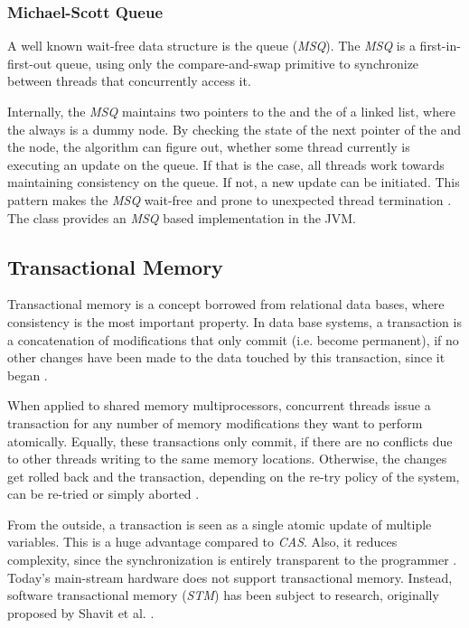 \subsubsection{Michael-Scott Queue}
\label{sec:introduction-msq}

A well known wait-free data structure is the \citet{Michael1996Simple} queue
(\emph{MSQ}). The \emph{MSQ} is a first-in-first-out queue, using only the
compare-and-swap primitive to synchronize between threads that concurrently
access it.

Internally, the \emph{MSQ} maintains two pointers to the  and
the  of a linked list, where the  always is a
dummy node. By checking the state of the next pointer of the 
and the  node, the algorithm can figure out, whether some
thread currently is executing an update on the queue. If that is the case, all
threads work towards maintaining consistency on the queue. If not, a new update
can be initiated. This pattern makes the \emph{MSQ} wait-free and prone to
unexpected thread termination \cite{Michael1996Simple, Goetz2006Java}. The
 class provides an \emph{MSQ} based
implementation in the JVM.

\subsection{Transactional Memory}
\label{sec:introduction-transm}

Transactional memory is a concept borrowed from relational data bases, where
consistency is the most important property. In data base systems, a transaction
is a concatenation of modifications that only commit (i.e. become permanent), if
no other changes have been made to the data touched by this transaction, since
it began \cite{Herlihy2008Art}.

When applied to shared memory multiprocessors, concurrent threads issue a
transaction for any number of memory modifications they want to perform
atomically. Equally, these transactions only commit, if there are no conflicts
due to other threads writing to the same memory locations. Otherwise, the
changes get rolled back and the transaction, depending on the re-try policy of
the system, can be re-tried or simply aborted \cite{Herlihy2008Art}.

From the outside, a transaction is seen as a single atomic update of multiple
variables. This is a huge advantage compared to \emph{CAS}. Also, it reduces
complexity, since the synchronization is entirely transparent to the programmer
\cite{Herlihy2008Art}. Today's main-stream hardware does not support
transactional memory. Instead, software transactional memory (\emph{STM}) has
been subject to research, originally proposed by Shavit et
al. \cite{Shavit1997Software, Herlihy2008Art}.

